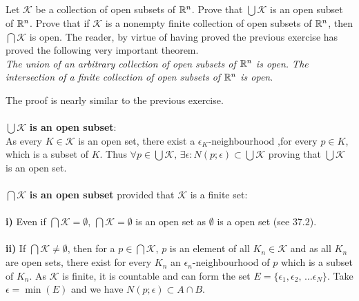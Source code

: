 \subsection{}
\begin{tcolorbox}
Let $\mathscr{K}$ be a collection of open subsets of $\mathbb{R}^n$. Prove that $\bigcup\mathscr{K}$ is an open subset of $\mathbb{R}^n$. Prove that if $\mathscr{K}$ is a nonempty finite
collection of open subsets of $\mathbb{R}^n$, then $\bigcap \mathscr{K}$ is open.
The reader, by virtue of having proved the previous exercise
has proved the following very important theorem. \\
\textit{The union of an arbitrary collection of open subsets of $\mathbb{R}^n$ is open. The intersection of a finite collection of open subsets of $\mathbb{R}^n$ is open}.
\end{tcolorbox}
The proof is nearly similar to the previous exercise.\\\\
$\bigcup\mathscr{K}$ \textbf{is an open subset}:\\
As every $K\in\mathscr{K}$ is an open set, there exist a $\epsilon_K$-neighbourhood ,for every $p\in K$, which is a subset of $K$. Thus $\forall p\in \bigcup\mathscr{K},\, \exists \epsilon: N(p;\epsilon)\subset \bigcup\mathscr{K}$ proving that $\bigcup\mathscr{K}$ is an open set.\\\\
$\bigcap\mathscr{K}$ \textbf{is an open subset} provided that $\mathscr{K}$ is a finite set:\\\\
\textbf{i)} Even if $\bigcap\mathscr{K}=\emptyset$, $\bigcap\mathscr{K}=\emptyset$ is an open set as $\emptyset$ is a open set (see $\mathbf{37.2}$).\\\\
\textbf{ii) }If  $\bigcap\mathscr{K}\neq\emptyset$,  then for a $p\in  \bigcap\mathscr{K}$,  $p$ is an element of all $K_n\in \mathscr{K}$ and as all $K_n$ are open sets, there exist for every $K_n$ an  $\epsilon_n$-neighbourhood of $p$ which is a subset of $K_n$. As $\mathscr{K}$ is finite, it is countable and can form the set $E=\{\epsilon_1,\epsilon_2,\, \dots \epsilon_N\}$. Take $\epsilon = \min (E)$ and we have $N(p;\epsilon)\subset A\cap B$.\\\\

